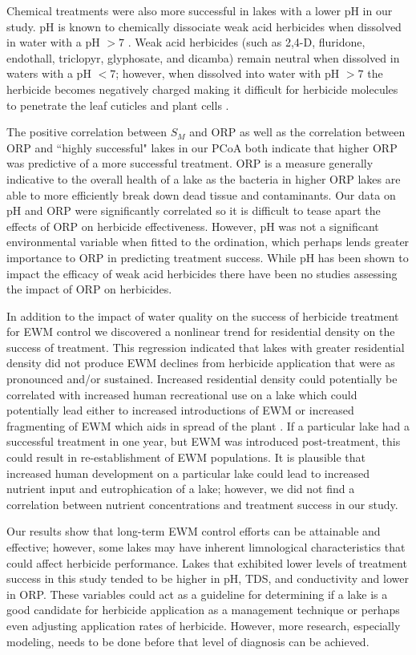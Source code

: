 \documentclass{article}
\begin{document}
Chemical treatments were also more successful in lakes with a lower pH in our study. pH is known to chemically dissociate weak acid herbicides when dissolved in water with a pH $> 7$ \citep{Chahal2012, Baur1974}. Weak acid herbicides (such as 2,4-D, fluridone, endothall, triclopyr, glyphosate, and dicamba) remain neutral when dissolved in waters with a pH $< 7$; however, when dissolved into water with pH $> 7$ the herbicide becomes negatively charged making it difficult for herbicide molecules to penetrate the leaf cuticles and plant cells \citep{Baur1974, Crafts1953}. 

The positive correlation between $S_{M}$ and ORP as well as the correlation between ORP and ``highly successful" lakes in our PCoA both indicate that higher ORP was predictive of a more successful treatment. ORP is a measure generally indicative to the overall health of a lake as the bacteria in higher ORP lakes are able to more efficiently break down dead tissue and contaminants. Our data on pH and ORP were significantly correlated so it is difficult to tease apart the effects of ORP on herbicide effectiveness. However, pH was not a significant environmental variable when fitted to the ordination, which perhaps lends greater importance to ORP in predicting treatment success. While pH has been shown to impact the efficacy of weak acid herbicides there have been no studies assessing the impact of ORP on herbicides.

In addition to the impact of water quality on the success of herbicide treatment for EWM control we discovered a nonlinear trend for residential density on the success of treatment. This regression indicated that lakes with greater residential density did not produce EWM declines from herbicide application that were as pronounced and/or sustained. Increased residential density could potentially be correlated with increased human recreational use on a lake which could potentially lead either to increased introductions of EWM or increased fragmenting of EWM which aids in spread of the plant \citep{SmithBarko1990}. If a particular lake had a successful treatment in one year, but EWM was introduced post-treatment, this could result in re-establishment of EWM populations. It is plausible that increased human development on a particular lake could lead to increased nutrient input and eutrophication of a lake; however, we did not find a correlation between nutrient concentrations and treatment success in our study.

Our results show that long-term EWM control efforts can be attainable and effective; however, some lakes may have inherent limnological characteristics that could affect herbicide performance. Lakes that exhibited lower levels of treatment success in this study tended to be higher in pH, TDS, and conductivity and lower in ORP. These variables could act as a guideline for determining if a lake is a good candidate for herbicide application as a management technique or perhaps even adjusting application rates of herbicide. However, more research, especially modeling, needs to be done before that level of diagnosis can be achieved. 
\end{document}
